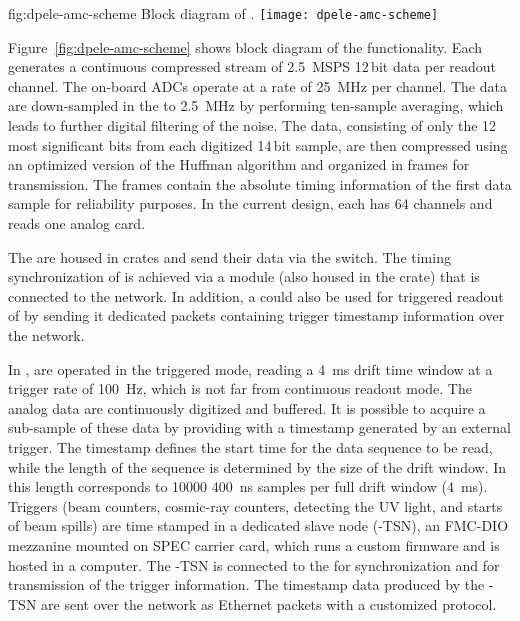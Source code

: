 \begin{dunefigure}{fig:dpele-amc-scheme}
{Block diagram of .}
\texttt{[image: dpele-amc-scheme]}
\end{dunefigure}
Figure~\ref{fig:dpele-amc-scheme} shows block diagram of the  functionality. Each  generates a continuous compressed stream of \SI{2.5}{MSPS} \num{12}\,bit data per readout channel. The on-board ADCs operate at a rate of \SI{25}{\MHz} per channel. The data are down-sampled in the  to \SI{2.5}{\MHz} by performing ten-sample averaging, which leads to further digital filtering of the noise. The data, consisting of only the  \num{12} most significant bits from each digitized \num{14}\,bit sample, are then compressed using an optimized version of the Huffman algorithm and organized in frames for transmission.  The frames contain the absolute timing information of the first data sample for reliability purposes. In the current design, each  has \num{64} channels and reads one analog  card.

The  are housed in  crates and send their data via the  switch. The timing synchronization of  is achieved via a  module (also housed in the crate) that is connected to the  network. In addition, a   could also be used for triggered readout of  by sending it dedicated packets containing trigger timestamp information over the  network.

In ,  are operated in the triggered mode, reading a \SI{4}{\milli\second} drift time window at a trigger rate of \SI{100}{Hz}, which is not far from %
continuous readout mode. The analog data are continuously digitized and buffered. It is possible to acquire a sub-sample of these data %
by providing  with a timestamp generated by an external trigger. The timestamp defines the start time for the data sequence to be read, while the length of the sequence is determined by the size of the drift window. In  this length corresponds to \num{10000} \SI{400}{\nano\second} samples per full drift window (\SI{4}{\milli\second}). 
 Triggers (beam counters, cosmic-ray counters,  detecting the UV light, and starts of beam spills) are time stamped in a dedicated  slave node (-TSN), an FMC-DIO mezzanine mounted on  SPEC carrier card, which runs a custom firmware and is hosted in a computer. The -TSN is connected to the  for synchronization and for transmission of the trigger information. The timestamp data produced by the -TSN are sent over the  network as Ethernet packets with a customized protocol. 

